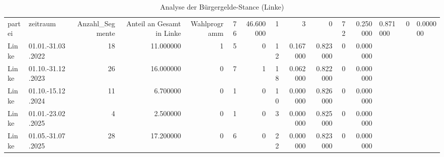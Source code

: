 \begin{table}
\caption{Analyse der Bürgergelde-Stance (Linke)}
\label{tab:meine_tabelle}
\begin{tabular}{llrrrrrrrrrr}
\toprule
partei & zeitraum & Anzahl_Segmente & Anteil an Gesamt in %
\midrule
Linke & Wahlprogramm & 76 & 46.600000 & 1 & 3 & 0 & 72 & 0.250000 & 0.871000 & 0 & 0.000000 \\
Linke & 01.01.-31.03.2022 & 18 & 11.000000 & 1 & 5 & 0 & 12 & 0.167000 & 0.823000 & 0 & 0.000000 \\
Linke & 01.10.-31.12.2023 & 26 & 16.000000 & 0 & 7 & 1 & 18 & 0.062000 & 0.822000 & 0 & 0.000000 \\
Linke & 01.10.-15.12.2024 & 11 & 6.700000 & 0 & 1 & 0 & 10 & 0.000000 & 0.826000 & 0 & 0.000000 \\
Linke & 01.01.-23.02.2025 & 4 & 2.500000 & 0 & 1 & 0 & 3 & 0.000000 & 0.825000 & 0 & 0.000000 \\
Linke & 01.05.-31.07.2025 & 28 & 17.200000 & 0 & 6 & 0 & 22 & 0.000000 & 0.823000 & 0 & 0.000000 \\
\bottomrule
\end{tabular}
\end{table}
